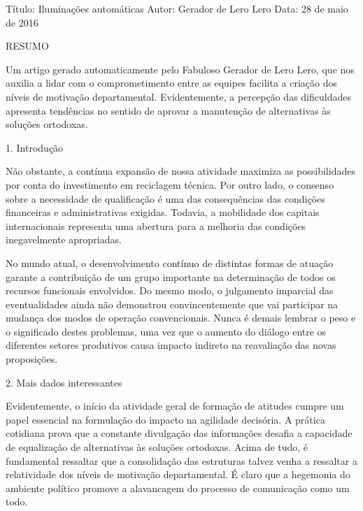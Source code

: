 %
%
%
%

Título: Iluminações automáticas
Autor: Gerador de Lero Lero
Data: 28 de maio de 2016

RESUMO

Um artigo gerado automaticamente pelo Fabuloso Gerador de Lero Lero, que nos
auxilia a lidar com o comprometimento entre as equipes facilita a criação dos
níveis de motivação departamental. Evidentemente, a percepção das dificuldades
apresenta tendências no sentido de aprovar a manutenção de alternativas às
soluções ortodoxas.

1. Introdução

Não obstante, a contínua expansão de nossa atividade maximiza as possibilidades
por conta do investimento em reciclagem técnica. Por outro lado, o consenso
sobre a necessidade de qualificação é uma das consequências das condições
financeiras e administrativas exigidas. Todavia, a mobilidade dos capitais
internacionais representa uma abertura para a melhoria das condições
inegavelmente apropriadas.

No mundo atual, o desenvolvimento contínuo de distintas formas de atuação
garante a contribuição de um grupo importante na determinação de todos os
recursos funcionais envolvidos. Do mesmo modo, o julgamento imparcial das
eventualidades ainda não demonstrou convincentemente que vai participar na
mudança dos modos de operação convencionais. Nunca é demais lembrar o peso e o
significado destes problemas, uma vez que o aumento do diálogo entre os
diferentes setores produtivos causa impacto indireto na reavaliação das novas
proposições.

2. Mais dados interessantes

Evidentemente, o início da atividade geral de formação de atitudes cumpre um
papel essencial na formulação do impacto na agilidade decisória. A prática
cotidiana prova que a constante divulgação das informações desafia a capacidade
de equalização de alternativas às soluções ortodoxas. Acima de tudo, é
fundamental ressaltar que a consolidação das estruturas talvez venha a
ressaltar a relatividade dos níveis de motivação departamental. É claro que a
hegemonia do ambiente político promove a alavancagem do processo de comunicação
como um todo.

